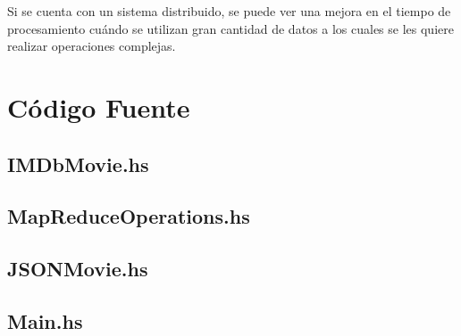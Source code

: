 \documentclass[a4paper,11pt]{article}
\begin{document}
Si se cuenta con un sistema distribuido, se puede ver una mejora en el tiempo de procesamiento cuándo se utilizan gran cantidad de datos a los cuales se les quiere realizar operaciones complejas.

\pagebreak

\section{Código Fuente}

\lstset{breaklines=true, xleftmargin=.1in, xrightmargin=.1in} 

\subsection{IMDbMovie.hs}


\pagebreak

\subsection{MapReduceOperations.hs}


\pagebreak

\subsection{JSONMovie.hs}


\subsection{Main.hs}




\end{document}
